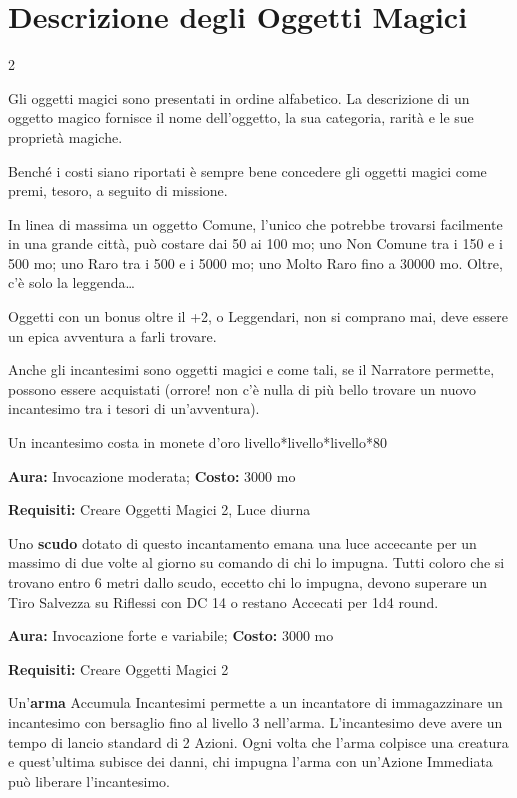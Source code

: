 \section{Descrizione degli Oggetti Magici}

\begin{multicols}{2}

Gli oggetti magici sono presentati in ordine alfabetico. La descrizione di un oggetto magico fornisce il nome dell'oggetto, la sua categoria, rarità e le sue proprietà magiche.

Benché i costi siano riportati è sempre bene concedere gli oggetti magici come premi, tesoro, a seguito di missione.

In linea di massima un oggetto Comune, l'unico che potrebbe trovarsi facilmente in una grande città, può costare dai 50 ai 100 mo; uno Non Comune tra i 150 e i 500 mo; uno Raro tra i 500 e i 5000 mo; uno Molto Raro fino a 30000 mo. Oltre, c'è solo la leggenda…

Oggetti con un bonus oltre il +2, o Leggendari, non si comprano mai, deve essere un epica avventura a farli trovare.

\medskip

Anche gli incantesimi sono oggetti magici e come tali, se il Narratore permette, possono essere acquistati (orrore! non c'è nulla di più bello trovare un nuovo incantesimo tra i tesori di un'avventura).

Un incantesimo costa in monete d'oro livello*livello*livello*80

\medskip


\textbf{Aura:} Invocazione moderata; \textbf{Costo:} 3000 mo

\textbf{Requisiti:} Creare Oggetti Magici 2, Luce diurna

Uno \textbf{scudo} dotato di questo incantamento emana una luce accecante per un massimo di due volte al giorno su comando di chi lo impugna. Tutti coloro che si trovano entro 6 metri dallo scudo, eccetto chi lo impugna, devono superare un Tiro Salvezza su Riflessi con DC 14 o restano Accecati per 1d4 round.


\textbf{Aura:} Invocazione forte e variabile; \textbf{Costo:} 3000 mo

\textbf{Requisiti:} Creare Oggetti Magici 2

Un'\textbf{arma} Accumula Incantesimi permette a un incantatore di immagazzinare un incantesimo con bersaglio fino al livello 3 nell'arma. L'incantesimo deve avere un tempo di lancio standard di 2 Azioni. Ogni volta che l'arma colpisce una creatura e quest'ultima subisce dei danni, chi impugna l'arma con un'Azione Immediata può liberare l'incantesimo.


\end{multicols}
